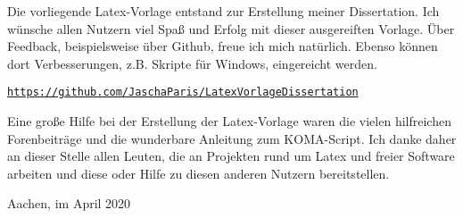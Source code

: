 
Die vorliegende Latex-Vorlage entstand zur Erstellung meiner Dissertation. Ich wünsche allen Nutzern viel Spaß und Erfolg mit dieser ausgereiften Vorlage. Über Feedback, beispielsweise über Github, freue ich mich natürlich. Ebenso können dort Verbesserungen, z.B. Skripte für Windows, eingereicht werden.

\texttt{\url{https://github.com/JaschaParis/LatexVorlageDissertation}}

Eine große Hilfe bei der Erstellung der Latex-Vorlage waren die vielen hilfreichen Forenbeiträge und die wunderbare Anleitung zum \textsc{KOMA}-Script. Ich danke daher an dieser Stelle allen Leuten, die an Projekten rund um Latex und freier Software arbeiten und diese oder Hilfe zu diesen anderen Nutzern bereitstellen.

\vspace{5mm}
\par
\begingroup
\leftskip=1cm %
\noindent 
Aachen, im April 2020

\vspace{-5mm}
\leftskip=1cm %
\autor
\par
\endgroup
